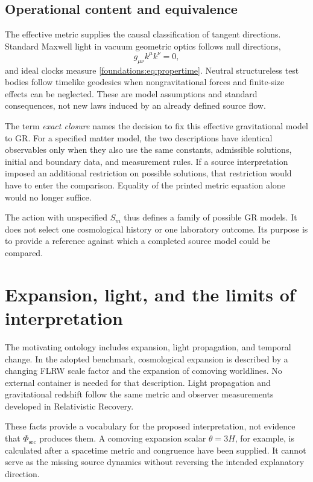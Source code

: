\documentclass[11pt,oneside]{report}
\newcommand{\PhiSrc}{\Phi_{\mathrm{src}}}
\theoremstyle{remark}
\numberwithin{definition}{chapter}
\numberwithin{proposition}{chapter}
\numberwithin{remark}{chapter}
\begin{document}
\subsection{Operational content and equivalence}
The effective metric supplies the causal classification of tangent directions. Standard Maxwell light in vacuum geometric optics follows null directions,
\begin{equation}
g_{\mu\nu}k^\mu k^\nu=0,
\label{foundations:eq:null}
\end{equation}
and ideal clocks measure \eqref{foundations:eq:propertime}. Neutral structureless test bodies follow timelike geodesics when nongravitational forces and finite-size effects can be neglected. These are model assumptions and standard consequences, not new laws induced by an already defined source flow.

The term \emph{exact closure} names the decision to fix this effective gravitational model to GR. For a specified matter model, the two descriptions have identical observables only when they also use the same constants, admissible solutions, initial and boundary data, and measurement rules. If a source interpretation imposed an additional restriction on possible solutions, that restriction would have to enter the comparison. Equality of the printed metric equation alone would no longer suffice.

The action with unspecified $S_m$ thus defines a family of possible GR models. It does not select one cosmological history or one laboratory outcome. Its purpose is to provide a reference against which a completed source model could be compared.

\section{Expansion, light, and the limits of interpretation}
The motivating ontology includes expansion, light propagation, and temporal change. In the adopted benchmark, cosmological expansion is described by a changing FLRW scale factor and the expansion of comoving worldlines. No external container is needed for that description. Light propagation and gravitational redshift follow the same metric and observer measurements developed in Relativistic Recovery.

These facts provide a vocabulary for the proposed interpretation, not evidence that $\PhiSrc$ produces them. A comoving expansion scalar $\theta=3H$, for example, is calculated after a spacetime metric and congruence have been supplied. It cannot serve as the missing source dynamics without reversing the intended explanatory direction.
\end{document}
